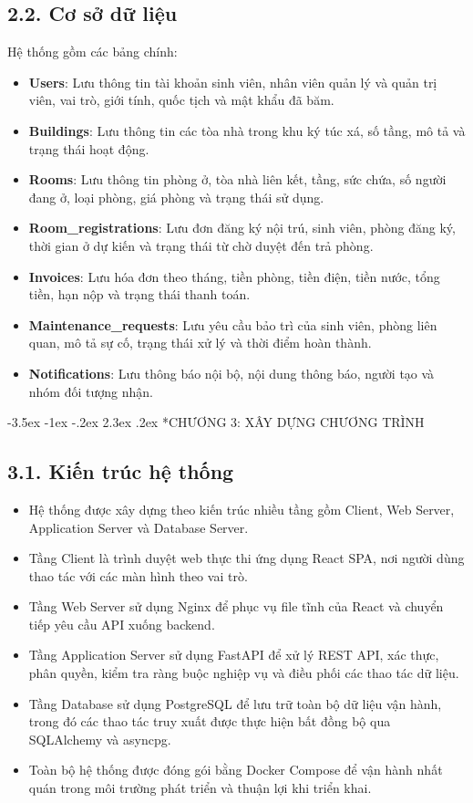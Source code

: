 \documentclass[13pt,a4paper]{extarticle}
\makeatletter
\renewcommand\section{\@startsection {section}{1}{\z@}%
	{-3.5ex \@plus -1ex \@minus -.2ex}%
	{2.3ex \@plus .2ex}%
	{\centering\normalfont\Large\bfseries}}
\makeatother
\begin{document}
	\subsection*{2.2. Cơ sở dữ liệu}
	Hệ thống gồm các bảng chính:
	\begin{itemize}
		\item \textbf{Users}: Lưu thông tin tài khoản sinh viên, nhân viên quản lý và quản trị viên, vai trò, giới tính, quốc tịch và mật khẩu đã băm.
		\item \textbf{Buildings}: Lưu thông tin các tòa nhà trong khu ký túc xá, số tầng, mô tả và trạng thái hoạt động.
		\item \textbf{Rooms}: Lưu thông tin phòng ở, tòa nhà liên kết, tầng, sức chứa, số người đang ở, loại phòng, giá phòng và trạng thái sử dụng.
		\item \textbf{Room\_registrations}: Lưu đơn đăng ký nội trú, sinh viên, phòng đăng ký, thời gian ở dự kiến và trạng thái từ chờ duyệt đến trả phòng.
		\item \textbf{Invoices}: Lưu hóa đơn theo tháng, tiền phòng, tiền điện, tiền nước, tổng tiền, hạn nộp và trạng thái thanh toán.
		\item \textbf{Maintenance\_requests}: Lưu yêu cầu bảo trì của sinh viên, phòng liên quan, mô tả sự cố, trạng thái xử lý và thời điểm hoàn thành.
		\item \textbf{Notifications}: Lưu thông báo nội bộ, nội dung thông báo, người tạo và nhóm đối tượng nhận.
	\end{itemize}
	
	\section*{CHƯƠNG 3: XÂY DỰNG CHƯƠNG TRÌNH}
	
	\subsection*{3.1. Kiến trúc hệ thống}
	\begin{itemize}
		\item Hệ thống được xây dựng theo kiến trúc nhiều tầng gồm Client, Web Server, Application Server và Database Server.
		\item Tầng Client là trình duyệt web thực thi ứng dụng React SPA, nơi người dùng thao tác với các màn hình theo vai trò.
		\item Tầng Web Server sử dụng Nginx để phục vụ file tĩnh của React và chuyển tiếp yêu cầu API xuống backend.
		\item Tầng Application Server sử dụng FastAPI để xử lý REST API, xác thực, phân quyền, kiểm tra ràng buộc nghiệp vụ và điều phối các thao tác dữ liệu.
		\item Tầng Database sử dụng PostgreSQL để lưu trữ toàn bộ dữ liệu vận hành, trong đó các thao tác truy xuất được thực hiện bất đồng bộ qua SQLAlchemy và asyncpg.
		\item Toàn bộ hệ thống được đóng gói bằng Docker Compose để vận hành nhất quán trong môi trường phát triển và thuận lợi khi triển khai.
	\end{itemize}
	
\end{document}
